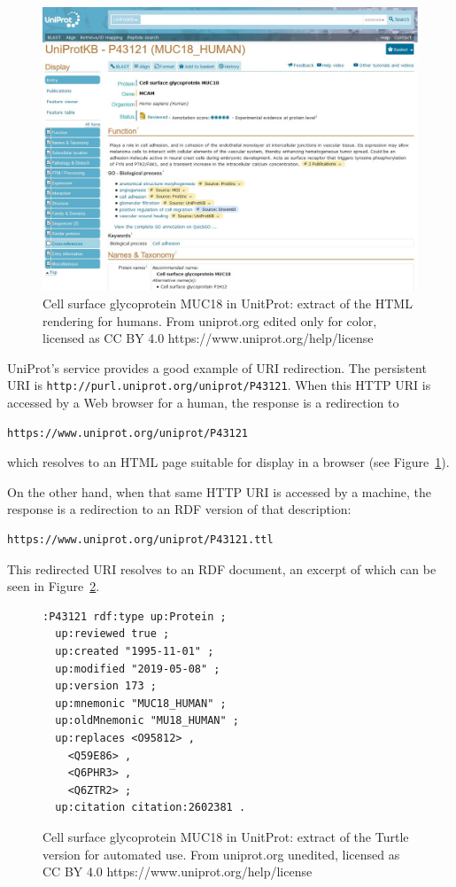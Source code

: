 \begin{figure}
    \centering
    \includegraphics[width=5.0in]{media/ch5/figure-05-05.jpg}
    \caption{Cell surface glycoprotein MUC18 in UnitProt: extract of the HTML
rendering for humans.  From uniprot.org edited only for color, licensed as CC BY 4.0 https://www.uniprot.org/help/license }
    \label{fig:ch5.5}
\end{figure}

UniProt's service provides a good example of URI redirection.  The persistent URI is \texttt{http://purl.uniprot.org/uniprot/P43121}.  
When this HTTP URI is accessed by a Web browser for a human,  the response is a redirection to 

\begin{lstlisting}
https://www.uniprot.org/uniprot/P43121
\end{lstlisting}

which resolves to an HTML
page suitable for display in a browser (see Figure~\ref{fig:ch5.5}).   

On the other hand, when  that same HTTP URI is accessed by a 
machine,  the
response is a redirection to an RDF version of that description:

\begin{lstlisting}
https://www.uniprot.org/uniprot/P43121.ttl
\end{lstlisting}

This redirected URI resolves to an RDF document, an excerpt of which can be seen in 
Figure~\ref{fig:ch5.6}.


\begin{figure}
\begin{lstlisting}
:P43121 rdf:type up:Protein ;
  up:reviewed true ;
  up:created "1995-11-01" ;
  up:modified "2019-05-08" ;
  up:version 173 ;
  up:mnemonic "MUC18_HUMAN" ;
  up:oldMnemonic "MU18_HUMAN" ;
  up:replaces <O95812> ,
    <Q59E86> ,
    <Q6PHR3> ,
    <Q6ZTR2> ;
  up:citation citation:2602381 .
\end{lstlisting}
    \caption{Cell surface glycoprotein MUC18 in UnitProt: extract of the
Turtle version for automated use.  From uniprot.org unedited, licensed as CC BY 4.0 https://www.uniprot.org/help/license}
    \label{fig:ch5.6}
\end{figure}

